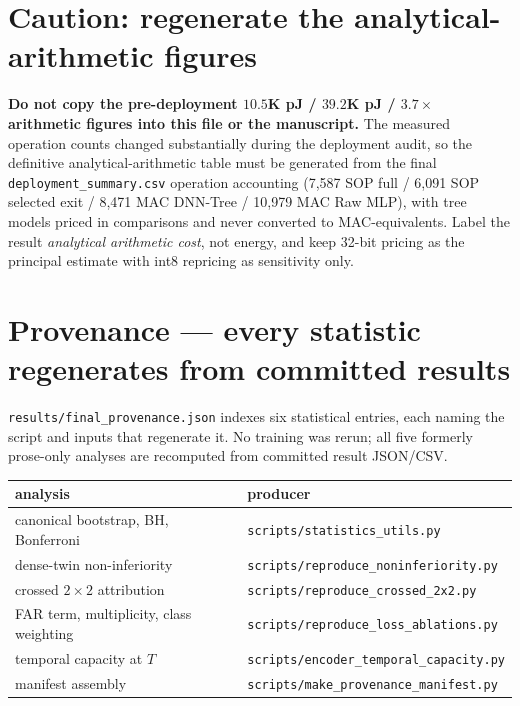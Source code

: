\section*{$\!$Caution: regenerate the analytical-arithmetic figures}

\textbf{Do not copy the pre-deployment $10.5$K pJ / $39.2$K pJ / $3.7\times$ arithmetic
figures into this file or the manuscript.} The measured operation counts changed
substantially during the deployment audit, so the definitive analytical-arithmetic table
must be generated from the final \texttt{deployment\_summary.csv} operation accounting
(7{,}587 SOP full / 6{,}091 SOP selected exit / 8{,}471 MAC DNN-Tree /
10{,}979 MAC Raw MLP), with tree models priced in comparisons and never converted to
MAC-equivalents. Label the result \emph{analytical arithmetic cost}, not energy, and keep
32-bit pricing as the principal estimate with int8 repricing as sensitivity only.

\section*{Provenance --- every statistic regenerates from committed results}

\texttt{results/final\_provenance.json} indexes six statistical entries, each naming the
script and inputs that regenerate it. No training was rerun; all five formerly
prose-only analyses are recomputed from committed result JSON/CSV.

\begin{center}\small
\begin{tabular}{ll}\toprule
analysis & producer \\\midrule
canonical bootstrap, BH, Bonferroni & \texttt{scripts/statistics\_utils.py} \\
dense-twin non-inferiority & \texttt{scripts/reproduce\_noninferiority.py} \\
crossed $2\times2$ attribution & \texttt{scripts/reproduce\_crossed\_2x2.py} \\
FAR term, multiplicity, class weighting & \texttt{scripts/reproduce\_loss\_ablations.py} \\
temporal capacity at $T$ & \texttt{scripts/encoder\_temporal\_capacity.py} \\
manifest assembly & \texttt{scripts/make\_provenance\_manifest.py} \\
\bottomrule\end{tabular}\end{center}

